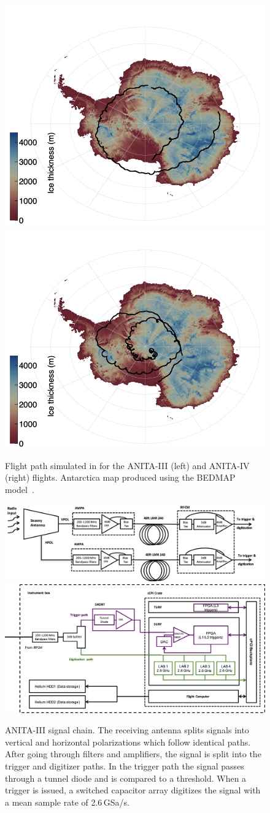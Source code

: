 \begin{figure}[!h]\centering
  \includegraphics[width=.45\linewidth]{./Figs/Flightpath_ANITA3.png}
  \includegraphics[width=.45\linewidth]{./Figs/Flightpath_ANITA4.png}
  \caption{Flight path simulated in \icemc for the ANITA-III (left) and ANITA-IV (right) flights.
    Antarctica map produced using the BEDMAP model~\cite{bedmap}.     }
  \label{fig:ANITA_flightPath}
\end{figure}



\begin{figure}[!h]\centering
  \includegraphics[width=.95\linewidth]{./Figs/ANITA3_signalChain1.png}
  \includegraphics[width=.95\linewidth]{./Figs/ANITA3_signalChain2.png}
  \caption{ANITA-III signal chain.
  The receiving antenna splits signals into vertical and horizontal
  polarizations which follow identical paths. 
After going through filters and amplifiers, the signal is split into
the trigger and digitizer paths. In the trigger path the signal passes
through a tunnel diode and is compared to a threshold. 
When a trigger is issued, a switched capacitor array digitizes the
signal with a mean sample rate of 2.6\,GSa/s.}
  \label{fig:ANITA3_signalChain}
\end{figure}


